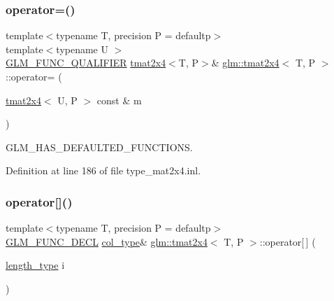 \mbox{\label{structglm_1_1tmat2x4_abc6565efeca20fb615abcc146b78efa2}} 
\subsubsection{\texorpdfstring{operator=()}{operator=()}\hspace{0.1cm}{\footnotesize\ttfamily [3/3]}}
{\footnotesize\ttfamily template$<$typename T, precision P = defaultp$>$ \\
template$<$typename U $>$ \\
\mbox{\hyperlink{setup_8hpp_a33fdea6f91c5f834105f7415e2a64407}{G\+L\+M\+\_\+\+F\+U\+N\+C\+\_\+\+Q\+U\+A\+L\+I\+F\+I\+ER}} \mbox{\hyperlink{structglm_1_1tmat2x4}{tmat2x4}}$<$T, P$>$\& \mbox{\hyperlink{structglm_1_1tmat2x4}{glm\+::tmat2x4}}$<$ T, P $>$\+::operator= (\begin{DoxyParamCaption}\item[{\mbox{\hyperlink{structglm_1_1tmat2x4}{tmat2x4}}$<$ U, P $>$ const \&}]{m }\end{DoxyParamCaption})}



G\+L\+M\+\_\+\+H\+A\+S\+\_\+\+D\+E\+F\+A\+U\+L\+T\+E\+D\+\_\+\+F\+U\+N\+C\+T\+I\+O\+NS. 



Definition at line 186 of file type\+\_\+mat2x4.\+inl.

\mbox{\label{structglm_1_1tmat2x4_a2bc91eaefd3d2fb68c70a5c0266f7be3}} 
\subsubsection{\texorpdfstring{operator[]()}{operator[]()}\hspace{0.1cm}{\footnotesize\ttfamily [1/2]}}
{\footnotesize\ttfamily template$<$typename T, precision P = defaultp$>$ \\
\mbox{\hyperlink{setup_8hpp_ab2d052de21a70539923e9bcbf6e83a51}{G\+L\+M\+\_\+\+F\+U\+N\+C\+\_\+\+D\+E\+CL}} \mbox{\hyperlink{structglm_1_1tmat2x4_a9effcccd2c4c50c385e4c3a2fe2feedb}{col\+\_\+type}}\& \mbox{\hyperlink{structglm_1_1tmat2x4}{glm\+::tmat2x4}}$<$ T, P $>$\+::operator\mbox{[}$\,$\mbox{]} (\begin{DoxyParamCaption}\item[{\mbox{\hyperlink{structglm_1_1tmat2x4_a8d8156b982138c22047082ca7a8f9009}{length\+\_\+type}}}]{i }\end{DoxyParamCaption})}

